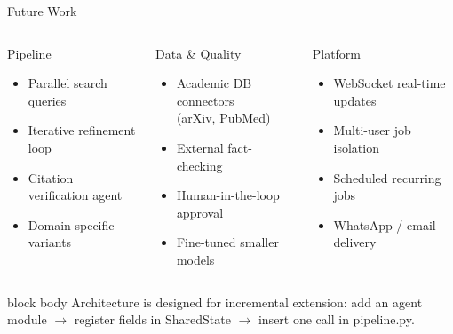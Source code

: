 \documentclass[aspectratio=169, 10pt]{beamer}
\newcommand{\code}[1]{{\ttfamily\small\color{code-red}#1}}
\newenvironment{hlbox}{%
  \begin{beamercolorbox}[rounded=true, sep=4pt, wd=\linewidth]{block body}%
    \small}{%
  \end{beamercolorbox}}
\begin{document}
\begin{frame}{Future Work}
  \begin{columns}[T]
      \begin{block}{Pipeline}
        \begin{itemize}
          \item Parallel search queries
          \item Iterative refinement loop
          \item Citation verification agent
          \item Domain-specific variants
        \end{itemize}
      \end{block}
      \begin{block}{Data \& Quality}
        \begin{itemize}
          \item Academic DB connectors\\(arXiv, PubMed)
          \item External fact-checking
          \item Human-in-the-loop approval
          \item Fine-tuned smaller models
        \end{itemize}
      \end{block}
      \begin{block}{Platform}
        \begin{itemize}
          \item WebSocket real-time updates
          \item Multi-user job isolation
          \item Scheduled recurring jobs
          \item WhatsApp / email delivery
        \end{itemize}
      \end{block}
  \end{columns}
  \vspace{0.5em}
  \begin{hlbox}
    Architecture is designed for incremental extension: add an agent module
    $\to$ register fields in \code{SharedState} $\to$ insert one call in
    \code{pipeline.py}.
  \end{hlbox}
\end{frame}
\end{document}
